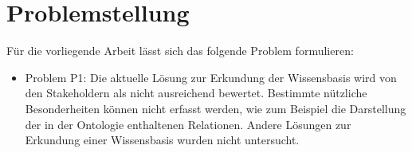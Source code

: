 \section{Problemstellung}\label{sec:problemstellung}




Für die vorliegende Arbeit lässt sich das folgende Problem formulieren:

\begin{itemize}
\item Problem P1: Die aktuelle Lösung zur Erkundung der Wissensbasis wird von den Stakeholdern als nicht ausreichend bewertet.
Bestimmte nützliche Besonderheiten können nicht erfasst werden, wie zum Beispiel die Darstellung der in der Ontologie enthaltenen Relationen. 
Andere Lösungen zur Erkundung einer Wissensbasis wurden nicht untersucht.
\end{itemize}

